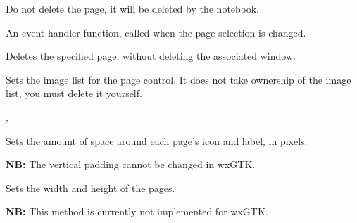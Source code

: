 Do not delete the page, it will be deleted by the notebook.




\label{wxnotebookonselchange}


An event handler function, called when the page selection is changed.




\label{wxnotebookremovepage}


Deletes the specified page, without deleting the associated window.


\label{wxnotebooksetimagelist}


Sets the image list for the page control. It does not take
ownership of the image list, you must delete it yourself.


,


\label{wxnotebooksetpadding}


Sets the amount of space around each page's icon and label, in pixels.

{\bf NB:} The vertical padding cannot be changed in wxGTK.


\label{wxnotebooksetpagesize}


Sets the width and height of the pages.

{\bf NB:} This method is currently not implemented for wxGTK.


\label{wxnotebooksetpageimage}


